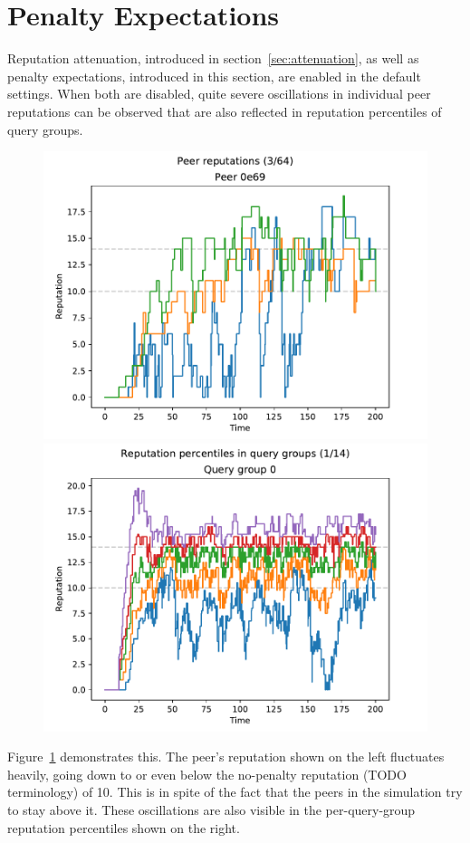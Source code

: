 \section{Penalty Expectations}
\label{sec:penalty_expectations}
Reputation attenuation, introduced in section~\ref{sec:attenuation}, as well as
penalty expectations, introduced in this section, are enabled in the default
settings. When both are disabled, quite severe oscillations in individual peer
reputations can be observed that are also reflected in reputation percentiles of
query groups.

\begin{figure}[t]
\centering
\includegraphics[width=0.5\columnwidth]{figures/expectations_off_no_att_peer_reps_3_of_64}%
\includegraphics[width=0.5\columnwidth]{figures/expectations_off_no_att_rep_percs_1_of_14}
\label{fig:penalty_expectations_off_no_att_peer_reps_percs}
\end{figure}

Figure~\ref{fig:penalty_expectations_off_no_att_peer_reps_percs} demonstrates
this. The peer's reputation shown on the left fluctuates heavily, going down to
or even below the no-penalty reputation (TODO terminology) of 10. This is in
spite of the fact that the peers in the simulation try to stay above it. These
oscillations are also visible in the per-query-group reputation percentiles
shown on the right.

